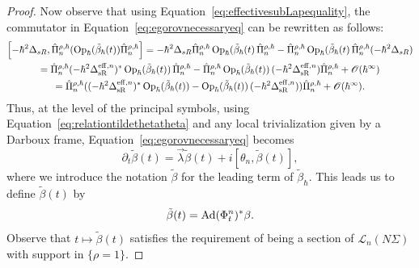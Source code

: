 \documentclass[12pt,a4paper]{amsart}
\theoremstyle{plain}
\theoremstyle{definition}
\theoremstyle{remark}
\numberwithin{equation}{section}
\theoremstyle{definition}
\def \Op{{\rm Op}}
\def \O{\mathscr{O}}
\numberwithin{equation}{section}
\begin{document}
\begin{proof}
    Now observe that using Equation~\eqref{eq:effectivesubLapequality}, the commutator in Equation~\eqref{eq:egorovnecessaryeq} can be rewritten as follows:
    \begin{multline*}
            \left[-\hbar^2\Delta_{sR},\hat{\Pi}_n^{\rho,\hbar} (\Op_\hbar(\tilde{\beta}_\hbar(t))\hat{\Pi}_n^{\rho,\hbar}\right] = -\hbar^2\Delta_{sR} \hat{\Pi}_n^{\rho,\hbar} \,\Op_\hbar(\tilde{\beta}_\hbar(t)\,\hat{\Pi}_n^{\rho,\hbar} - \hat{\Pi}_n^{\rho,\hbar} \,\Op_\hbar(\tilde{\beta}_\hbar(t)\,\hat{\Pi}_n^{\rho,\hbar}(-\hbar^2\Delta_{sR})\\
            = \hat{\Pi}_n^{\rho,\hbar} (-\hbar^2\Delta_{\rm sR}^{{\rm eff},n})^*\,\Op_\hbar(\tilde{\beta}_\hbar(t))\,\hat{\Pi}_n^{\rho,\hbar} - \hat{\Pi}_n^{\rho,\hbar} \,\Op_\hbar(\tilde{\beta}_\hbar(t))\, (-\hbar^2\Delta_{\rm sR}^{{\rm eff},n})\hat{\Pi}_n^{\rho,\hbar} + \O(\hbar^\infty)\\
            = \hat{\Pi}_n^{\rho,\hbar}((-\hbar^2\Delta_{\rm sR}^{{\rm eff},n})^*\,\Op_\hbar(\tilde{\beta}_\hbar(t)) - \Op_\hbar(\tilde{\beta}_\hbar(t))\, (-\hbar^2\Delta_{\rm sR}^{{\rm eff},n}))\hat{\Pi}_n^{\rho,\hbar}+\O(\hbar^\infty).
    \end{multline*}
    Thus, at the level of the principal symbols, using Equation~\eqref{eq:relationtildethetatheta} and any local trivialization given by a Darboux frame, Equation~\eqref{eq:egorovnecessaryeq} becomes
    \begin{equation}
        \label{eq:firsteqegorov}
        \partial_t \tilde{\beta}(t) = \vec{\lambda}\tilde{\beta}(t) + i[\theta_n,\tilde{\beta}(t)],
    \end{equation}
    where we introduce the notation $\tilde{\beta}$ for the leading term of $\tilde{\beta}_\hbar$.
    This leads us to define $\tilde{\beta}(t)$ by
    \begin{equation*}
        \tilde{\beta}(t) = {\rm Ad}(\Phi_t^n)^*\beta.
    \end{equation*}
    Observe that $t\mapsto\tilde{\beta}(t)$ satisfies the requirement of being a section of $\mathscr{L}_n(N\Sigma)$ with support in $\{\rho = 1\}$.
    

\end{proof}
\end{document}
